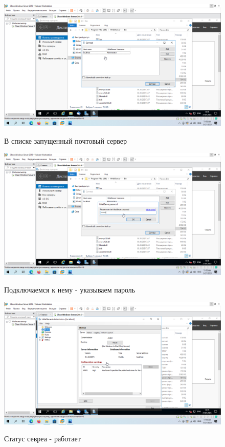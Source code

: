 \documentclass[a4paper]{article}
\begin{document}
  \begin{figure}[H]
    \centering
    \includegraphics[width=\textwidth]{11_0067}
    \label{img:67}
    \caption{В списке запущенный почтовый сервер}
  \end{figure}

  \begin{figure}[H]
    \centering
    \includegraphics[width=\textwidth]{11_0068}
    \label{img:68}
    \caption{Подключаемся к нему - указываем пароль}
  \end{figure}

  \begin{figure}[H]
    \centering
    \includegraphics[width=\textwidth]{11_0069}
    \label{img:69}
    \caption{Статус севреа - работает}
  \end{figure}
\end{document}
